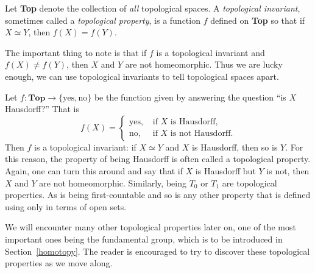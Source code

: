 \begin{defn}
  Let \textbf{Top} denote the collection of \emph{all} topological spaces. A \emph{topological invariant}, sometimes called a \emph{topological property}, is a function $f$ defined on \textbf{Top} so that if $X \simeq Y$, then $f(X) = f(Y)$.
\end{defn}
The important thing to note is that if $f$ is a topological invariant and $f(X) \not= f(Y)$, then $X$ and $Y$ are not homeomorphic. Thus we are lucky enough, we can use topological invariants to tell topological spaces apart.
\begin{example}
  Let $f : \textbf{Top} \to \{ \text{yes}, \text{no} \}$ be the function given by answering the question ``is $X$ Hausdorff?'' That is
  \[
    f(X) = \begin{cases} \text{yes}, &\text{ if $X$ is Hausdorff,}\\ \text{no}, &\text{ if $X$ is not Hausdorff.} \end{cases}
  \]
  Then $f$ is a topological invariant: if $X \simeq Y$ and $X$ is Hausdorff, then so is $Y$. For this reason, the property of being Hausdorff is often called a topological property. Again, one can turn this around and say that if $X$ is Hausdorff but $Y$ is not, then $X$ and $Y$ are not homeomorphic. Similarly, being $T_0$ or $T_1$ are topological properties. As is being first-countable and so is any other property that is defined using only in terms of open sets.
\end{example}

We will encounter many other topological properties later on, one of the most important ones being the fundamental group, which is to be introduced in Section~\ref{homotopy}. The reader is encouraged to try to discover these topological properties as we move along.

